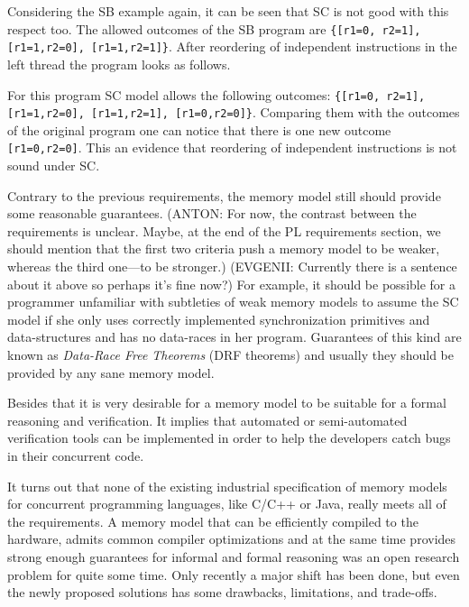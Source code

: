 \documentclass[a4paper,twoside,11pt]{article}
\numberwithin{equation}{section}
\begin{document}
Considering the SB example again, it can be seen that SC is not good with this respect too.
The allowed outcomes of the SB program are \texttt{\{[r1=0, r2=1], [r1=1,r2=0], [r1=1,r2=1]\}}.
After reordering of independent instructions in the left thread the program looks as follows.


For this program SC model allows the following outcomes: 
\texttt{\{[r1=0, r2=1], [r1=1,r2=0], [r1=1,r2=1], [r1=0,r2=0]\}}.
Comparing them with the outcomes of the original program one can notice
that there is one new outcome \texttt{[r1=0,r2=0]}.
This an evidence that reordering of independent instructions is not sound under SC.

Contrary to the previous requirements, the memory model still should provide some reasonable guarantees.
(ANTON: For now, the contrast between the requirements is unclear. Maybe, at the end of the PL requirements section,
we should mention that the first two criteria push a memory model to be weaker, whereas the third one---to be stronger.)
(EVGENII: Currently there is a sentence about it above so perhaps it's fine now?)
For example, it should be possible for a programmer unfamiliar with subtleties of weak memory models 
to assume the SC model if she only uses correctly implemented synchronization primitives 
and data-structures and has no data-races in her program.
Guarantees of this kind are known as \emph{Data-Race Free Theorems} (DRF theorems) 
and usually they should be provided by any sane memory model.  

Besides that it is very desirable for a memory model to be suitable for a formal reasoning and verification.
It implies that automated or semi-automated verification tools can be implemented 
in order to help the developers catch bugs in their concurrent code. 


It turns out that none of the existing industrial specification of memory models 
for concurrent programming languages, like C/C++ or Java, really meets all of the requirements.
A memory model that can be efficiently compiled to the hardware, admits common compiler optimizations 
and at the same time provides strong enough guarantees for informal and formal reasoning
was an open research problem for quite some time. 
Only recently a major shift has been done, but even the 
newly proposed solutions has some drawbacks, limitations, and trade-offs.    
\end{document}
